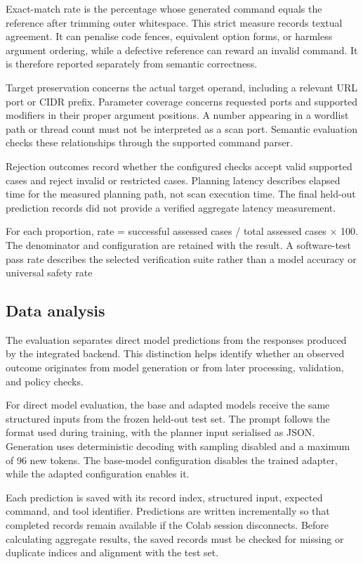 \documentclass[
]{article}
\begin{document}
Exact-match rate is the percentage whose generated command equals the
reference after trimming outer whitespace. This strict measure records
textual agreement. It can penalise code fences, equivalent option forms,
or harmless argument ordering, while a defective reference can reward an
invalid command. It is therefore reported separately from semantic
correctness.

Target preservation concerns the actual target operand, including a
relevant URL port or CIDR prefix. Parameter coverage concerns requested
ports and supported modifiers in their proper argument positions. A
number appearing in a wordlist path or thread count must not be
interpreted as a scan port. Semantic evaluation checks these
relationships through the supported command parser.

Rejection outcomes record whether the configured checks accept valid
supported cases and reject invalid or restricted cases. Planning latency
describes elapsed time for the measured planning path, not scan
execution time. The final held-out prediction records did not provide a
verified aggregate latency measurement.

For each proportion, rate = successful assessed cases / total assessed
cases × 100. The denominator and configuration are retained with the
result. A software-test pass rate describes the selected verification
suite rather than a model accuracy or universal safety rate

\hypertarget{data-analysis}{%
\subsection{\texorpdfstring{ Data
analysis}{ Data analysis}}\label{data-analysis}}

The evaluation separates direct model predictions from the responses
produced by the integrated backend. This distinction helps identify
whether an observed outcome originates from model generation or from
later processing, validation, and policy checks.

For direct model evaluation, the base and adapted models receive the
same structured inputs from the frozen held-out test set. The prompt
follows the format used during training, with the planner input
serialised as JSON. Generation uses deterministic decoding with sampling
disabled and a maximum of 96 new tokens. The base-model configuration
disables the trained adapter, while the adapted configuration enables
it.

Each prediction is saved with its record index, structured input,
expected command, and tool identifier. Predictions are written
incrementally so that completed records remain available if the Colab
session disconnects. Before calculating aggregate results, the saved
records must be checked for missing or duplicate indices and alignment
with the test set.
\end{document}
